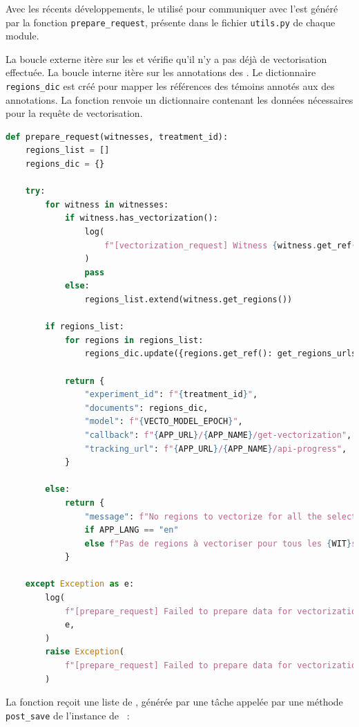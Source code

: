 Avec les récents développements, le \json utilisé pour communiquer avec l'\api est généré par la fonction \texttt{prepare\_request}, présente dans le fichier \texttt{utils.py} de chaque module. 

La boucle externe itère sur les \wits et vérifie qu'il n'y a pas déjà de vectorisation effectuée. La boucle interne itère sur les annotations des \wits. Le dictionnaire \texttt{regions\_dic} est créé pour mapper les références des témoins annotés aux \URLs des annotations. La fonction renvoie un dictionnaire contenant les données nécessaires pour la requête de vectorisation.

\begin{lstlisting}[language=python, frame=single, breaklines=true, caption={Structurer les \URLs de régions d'images.}]
def prepare_request(witnesses, treatment_id):
    regions_list = []
    regions_dic = {}

    try:
        for witness in witnesses:
            if witness.has_vectorization():
                log(
                    f"[vectorization_request] Witness {witness.get_ref()} already has vectorizations"
                )
                pass
            else:
                regions_list.extend(witness.get_regions())

        if regions_list:
            for regions in regions_list:
                regions_dic.update({regions.get_ref(): get_regions_urls(regions)})

            return {
                "experiment_id": f"{treatment_id}",
                "documents": regions_dic,
                "model": f"{VECTO_MODEL_EPOCH}",
                "callback": f"{APP_URL}/{APP_NAME}/get-vectorization",  # URL to which the SVG zip file must be sent back
                "tracking_url": f"{APP_URL}/{APP_NAME}/api-progress",
            }

        else:
            return {
                "message": f"No regions to vectorize for all the selected {WIT}es"
                if APP_LANG == "en"
                else f"Pas de regions à vectoriser pour tous les {WIT}s sélectionnés"
            }

    except Exception as e:
        log(
            f"[prepare_request] Failed to prepare data for vectorization request",
            e,
        )
        raise Exception(
            f"[prepare_request] Failed to prepare data for vectorization request"
        )
	\end{lstlisting}
 
La fonction reçoit une liste de \wits, générée par une tâche appelée par une méthode \texttt{post\_save} de l'instance de \tr~:

